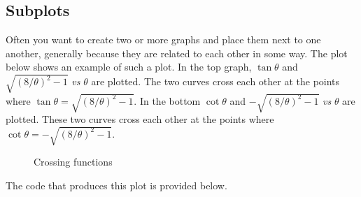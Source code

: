 \documentclass[letterpaper,10pt,english]{sphinxmanual}
\begin{document}
\subsection{Subplots}
\label{chap5/chap5_plot:subplots}
Often you want to create two or more graphs and place them next to one another, generally because they are related to each other in some way.  The plot below shows an example of such a plot.  In the top graph, \(\tan\theta\) and \(\sqrt{(8/\theta)^2-1}\) \emph{vs} \(\theta\) are plotted.  The two curves cross each other at the points where \(\tan\theta=\sqrt{(8/\theta)^2-1}\).  In the bottom  \(\cot\theta\) and \(-\sqrt{(8/\theta)^2-1}\) \emph{vs} \(\theta\) are plotted.  These two curves cross each other at the points where \(\cot\theta=-\sqrt{(8/\theta)^2-1}\).
\begin{figure}[htbp]
\centering
\capstart

\caption{Crossing functions}\label{chap5/chap5_plot:fig-subplotdemo}\end{figure}

The code that produces this plot is provided below.
\end{document}
